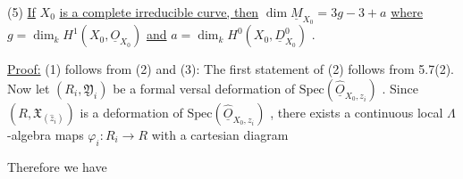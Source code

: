 
(5)  \underline{If} $X_0$ \underline{is a complete irreducible curve, then} $\dim \underline{M}_{X_0} = 3g - 3 + a$ \underline{where} $g = \dim_k H^1(X_0, \underline{O}_{X_0})$ \underline{and} $a = \dim_k H^0(X_0, \underline{D}^0_{X_0})$ .

\underline{Proof:}  (1) follows from (2) and (3): The first statement of (2) follows from 5.7(2). Now let $(R_i, \mathfrak{Y}_i)$ be a formal versal deformation of $\mathrm{Spec}(\hat{\underline{O}}_{X_0,z_i})$ . Since $(R, \mathfrak{X}_{(\widehat{z}_i)})$ is a deformation of $\mathrm{Spec}(\hat{\underline{O}}_{X_0,z_i})$ , there exists a continuous local $\Lambda$-algebra maps $\varphi_i : R_i \to R$ with a cartesian diagram

\begin{center}
\end{center}
Therefore we have

